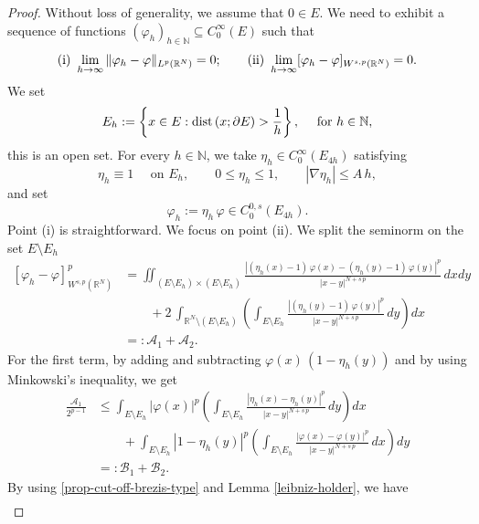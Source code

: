 \documentclass{amsart}
\theoremstyle{definition}
\numberwithin{equation}{section}
\begin{document}
	\begin{proof}
		Without loss of generality, we assume that $0 \in E$. We need to exhibit a sequence of functions $(\varphi_h)_{h \in \mathbb{N}} \subseteq C^\infty_0(E)$ such that 
		\[
		{\rm (i)}\,\, \lim_{h \to \infty}\|\varphi_h - \varphi\|_{L^p(\mathbb{R}^N)} =  0; \qquad {\rm (ii)} \,\, \lim_{h \to \infty} [\varphi_h - \varphi]_{W^{s,p}(\mathbb{R}^N)} = 0.
		\]
		We set 
		\[
		E_h := \left\{x \in E : {\rm dist}\left(x; \partial E\right) > \frac{1}{h}\right\}, \quad \mbox{ for } h \in \mathbb{N},
		\]
		this is an open set. For every $h \in \mathbb{N}$, we take $\eta_h \in C^\infty_0(E_{4h})$ satisfying 
		\begin{equation} \label{prop-cut-off-brezis-type}
			\eta_h \equiv 1 \quad \mbox{ on } E_h, \qquad 0 \le \eta_h \le 1, \qquad |\nabla\eta_h| \le A\,h,
		\end{equation} 
		and set 
		\begin{equation} \label{defi-lip}
			\varphi_h:= \eta_h\,\varphi \in C^{0,s}_0(E_{4h}).
		\end{equation}
		Point (i) is straightforward. We focus on point (ii). We split the seminorm on the set $E \setminus E_h$
		\[
		\begin{split}
			[\varphi_h - \varphi]^p_{W^{s,p}(\mathbb{R}^N)}
			&= \iint_{(E \setminus E_h) \times (E \setminus E_h)} \frac{|(\eta_h(x)-1)\,\varphi(x) - (\eta_h(y)-1)\,\varphi(y)|^p}{|x-y|^{N+s\,p}}\,dxdy \\&\qquad + 2\,\int_{\mathbb{R}^N \setminus (E \setminus E_h)} \left(\int_{E \setminus E_h} \frac{|(\eta_h(y) -1)\,\varphi(y)|^p}{|x-y|^{N+s\,p}}\,dy\right)dx\\
			&=: \mathcal{A}_1 + \mathcal{A}_2. 
		\end{split}
		\]
		For the first term, by adding and subtracting $\varphi(x)\,(1-\eta_h(y))$ and by using Minkowski's inequality, we get 
		\[
		\begin{split}
			\frac{\mathcal{A}_1}{2^{p-1}} &\le \int_{E \setminus E_h} |\varphi(x)|^p \left(\int_{E \setminus E_h} \frac{|\eta_h(x) - \eta_h(y)|^p}{|x-y|^{N+s\,p}}\,dy\right)dx \\& \qquad + \int_{E \setminus E_h} |1-\eta_h(y)|^p\left(\int_{E \setminus E_h} \frac{|\varphi(x) - \varphi(y)|^p}{|x-y|^{N+s\,p}}\,dx\right)dy \\
			&=: \mathcal{B}_1 + \mathcal{B}_2. 
		\end{split}
		\]
		By using \eqref{prop-cut-off-brezis-type} and Lemma \ref{leibniz-holder}, we have
		\[
		\begin{split}

\end{split}\]
\end{proof}
\end{document}
